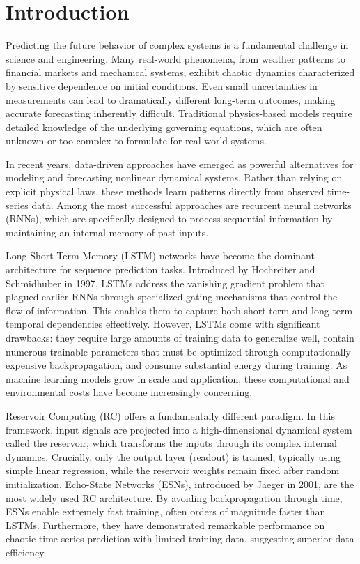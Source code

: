 \section{Introduction\label{chapter1}}

Predicting the future behavior of complex systems is a fundamental challenge in science and engineering. Many real-world phenomena, from weather patterns to financial markets and mechanical systems, exhibit chaotic dynamics characterized by sensitive dependence on initial conditions. Even small uncertainties in measurements can lead to dramatically different long-term outcomes, making accurate forecasting inherently difficult. Traditional physics-based models require detailed knowledge of the underlying governing equations, which are often unknown or too complex to formulate for real-world systems.

In recent years, data-driven approaches have emerged as powerful alternatives for modeling and forecasting nonlinear dynamical systems. Rather than relying on explicit physical laws, these methods learn patterns directly from observed time-series data. Among the most successful approaches are recurrent neural networks (RNNs), which are specifically designed to process sequential information by maintaining an internal memory of past inputs.

Long Short-Term Memory (LSTM) networks have become the dominant architecture for sequence prediction tasks. Introduced by Hochreiter and Schmidhuber in 1997, LSTMs address the vanishing gradient problem that plagued earlier RNNs through specialized gating mechanisms that control the flow of information. This enables them to capture both short-term and long-term temporal dependencies effectively. However, LSTMs come with significant drawbacks: they require large amounts of training data to generalize well, contain numerous trainable parameters that must be optimized through computationally expensive backpropagation, and consume substantial energy during training. As machine learning models grow in scale and application, these computational and environmental costs have become increasingly concerning.

Reservoir Computing (RC) offers a fundamentally different paradigm. In this framework, input signals are projected into a high-dimensional dynamical system called the reservoir, which transforms the inputs through its complex internal dynamics. Crucially, only the output layer (readout) is trained, typically using simple linear regression, while the reservoir weights remain fixed after random initialization. Echo-State Networks (ESNs), introduced by Jaeger in 2001, are the most widely used RC architecture. By avoiding backpropagation through time, ESNs enable extremely fast training, often orders of magnitude faster than LSTMs. Furthermore, they have demonstrated remarkable performance on chaotic time-series prediction with limited training data, suggesting superior data efficiency.


